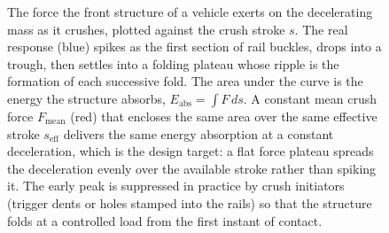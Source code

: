 \begin{figure}[htbp]
\begin{tikzpicture}
\end{tikzpicture}
\caption[Idealised vehicle crush force-deflection characteristic]{The
force the front structure of a vehicle exerts on the decelerating mass as
it crushes, plotted against the crush stroke $s$. The real response
(blue) spikes as the first section of rail buckles, drops into a trough,
then settles into a folding plateau whose ripple is the formation of each
successive fold. The area under the curve is the energy the structure
absorbs, $E_{\mathrm{abs}} = \int F\,ds$. A constant mean crush force
$F_{\mathrm{mean}}$ (red) that encloses the same area over the same
effective stroke $s_{\mathrm{eff}}$ delivers the same energy absorption at
a constant deceleration, which is the design target: a flat force plateau
spreads the deceleration evenly over the available stroke rather than
spiking it. The early peak is suppressed in practice by crush initiators
(trigger dents or holes stamped into the rails) so that the structure
folds at a controlled load from the first instant of contact.}
\label{fig:vol03ch05:crumple-force-deflection}
\end{figure}
